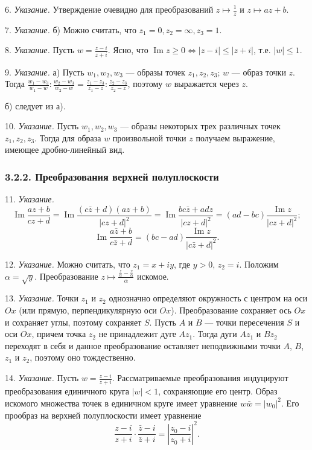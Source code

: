 	6. \textit{Указание.} Утверждение очевидно для преобразований $z \mapsto \frac{1}{z}$ и $z \mapsto az + b$.

	7. \textit{Указание.} б) Можно считать, что $z_1 = 0, z_2 = \infty, z_3 = 1$.

	8. \textit{Указание.} Пусть $w = \frac{z - i}{z + i}$. Ясно, что $\operatorname{Im} z \geq 0 \Leftrightarrow |z - i| \leq |z + i|$, т.е. $|w| \leq 1$.

	9. \textit{Указание.} а) Пусть $w_1, w_2, w_3$ --- образы точек $z_1, z_2, z_3$; $w$ --- образ точки $z$. Тогда $\frac{w_1 - w_3}{w_1 - w} : \frac{w_2 - w_3}{w_2 - w} = \frac{z_1 - z_3}{z_1 - z} : \frac{z_2 - z_3}{z_2 - z}$, поэтому $w$ выражается через $z$.

	б) следует из а).

	10. \textit{Указание.} Пусть $w_1, w_2, w_3$ --- образы некоторых трех различных точек $z_1, z_2, z_3$. Тогда для образа $w$ произвольной точки $z$ получаем выражение, имеющее дробно-линейный вид.
 
 
	\subsubsection{3.2.2. Преобразования верхней полуплоскости}
 
	11. \textit{Указание.}
	\[
		\operatorname{Im} \frac{az+b}{cz+d} = \operatorname{Im} \frac{(c\bar{z}+d)(az+b)}{|cz+d|^2} = \operatorname{Im} \frac{bc\bar{z} + adz}{|cz+d|^2} = (ad - bc) \frac{\operatorname{Im} z}{|cz+d|^2};
	\]
	\[
		\operatorname{Im} \frac{a\bar{z}+b}{c\bar{z}+d} = (bc - ad) \frac{\operatorname{Im} z}{|c\bar{z}+d|^2}.
	\]

	12. \textit{Указание.} Можно считать, что $z_1 = x + iy$, где $y > 0$, $z_2 = i$.
	Положим $\alpha = \sqrt{y}$. Преобразование $z \mapsto \frac{\frac{z}{\alpha} - \frac{x}{\alpha}}{\alpha}$ искомое.
 
	13. \textit{Указание.} Точки $z_1$ и $z_2$ однозначно определяют окружность с центром на оси $Ox$ (или прямую, перпендикулярную оси $Ox$). Преобразование сохраняет ось $Ox$ и сохраняет углы, поэтому сохраняет $S$. Пусть $A$ и $B$ --- точки пересечения $S$ и оси $Ox$, причем точка $z_2$ не принадлежит дуге $Az_1$. Тогда дуги $Az_1$ и $Bz_2$ переходят в себя и данное преобразование оставляет неподвижными точки $A$, $B$, $z_1$ и $z_2$, поэтому оно тождественно.

	14. \textit{Указание.} Пусть $w = \frac{z-i}{z+i}$. Рассматриваемые преобразования индуцируют преобразования единичного круга $|w| < 1$, сохраняющие его центр. Образ искомого множества точек в единичном круге имеет уравнение $w\bar{w} = |w_0|^2$. Его прообраз на верхней полуплоскости имеет уравнение
	\[
		\frac{z-i}{z+i} \cdot \frac{\bar{z}-i}{\bar{z}+i} = \left|\frac{z_0 - i}{z_0 + i}\right|^2.
	\]
 
